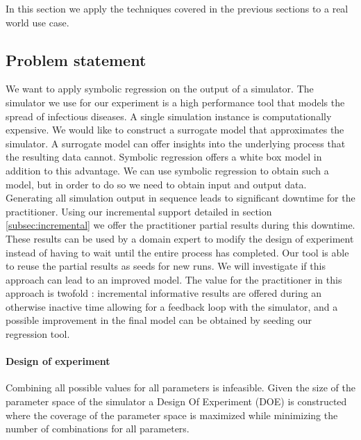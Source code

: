 In this section we apply the techniques covered in the previous sections to a real world use case.
\subsection{Problem statement}
We want to apply symbolic regression on the output of a simulator. The simulator we use for our experiment is a high performance tool \citep{stride} that models the spread of infectious diseases. 
A single simulation instance is computationally expensive. We would like to construct a surrogate model that approximates the simulator. A surrogate model can offer insights into the underlying process that the resulting data cannot. Symbolic regression offers a white box model in addition to this advantage. We can use symbolic regression to obtain such a model, but in order to do so we need to obtain input and output data. 
Generating all simulation output in sequence leads to significant downtime for the practitioner. Using our incremental support detailed in section \ref{subsec:incremental} we offer the practitioner partial results during this downtime. These results can be used by a domain expert to modify the design of experiment instead of having to wait until the entire process has completed. Our tool is able to reuse the partial results as seeds for new runs. We will investigate if this approach can lead to an improved model.
The value for the practitioner in this approach is twofold : incremental informative results are offered during an otherwise inactive time allowing for a feedback loop with the simulator, and a possible improvement in the final model can be obtained by seeding our regression tool.
\paragraph{Design of experiment}
Combining all possible values for all parameters is infeasible. 
Given the size of the parameter space of the simulator a Design Of Experiment (DOE) is constructed where the coverage of the parameter space is maximized while minimizing the number of combinations for all parameters. 

